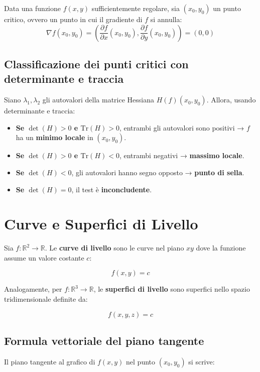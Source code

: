 \documentclass{article}
\begin{document}
Data una funzione \( f(x, y) \) sufficientemente regolare, sia \( (x_0, y_0) \) un punto critico, ovvero un punto in cui il gradiente di \( f \) si annulla:
\[
\nabla f(x_0, y_0) = \left( \frac{\partial f}{\partial x}(x_0, y_0), \frac{\partial f}{\partial y}(x_0, y_0) \right) = (0, 0)
\]

\subsection*{Classificazione dei punti critici con determinante e traccia}

Siano \( \lambda_1, \lambda_2 \) gli autovalori della matrice Hessiana \( H(f)(x_0, y_0) \). Allora, usando determinante e traccia:

\begin{itemize}
    \item \textbf{Se \( \det(H) > 0 \) e \( \text{Tr}(H) > 0 \)}, entrambi gli autovalori sono positivi → \( f \) ha un \textbf{minimo locale} in \( (x_0, y_0) \).
    
    \item \textbf{Se \( \det(H) > 0 \) e \( \text{Tr}(H) < 0 \)}, entrambi negativi → \textbf{massimo locale}.
    
    \item \textbf{Se \( \det(H) < 0 \)}, gli autovalori hanno segno opposto → \textbf{punto di sella}.
    
    \item \textbf{Se \( \det(H) = 0 \)}, il test è \textbf{inconcludente}.
\end{itemize}


\section{Curve e Superfici di Livello}
Sia \( f: \mathbb{R}^2 \to \mathbb{R} \). Le \textbf{curve di livello} sono le curve nel piano \( xy \) dove la funzione assume un valore costante \( c \):

\[
f(x, y) = c
\]

Analogamente, per \( f: \mathbb{R}^3 \to \mathbb{R} \), le \textbf{superfici di livello} sono superfici nello spazio tridimensionale definite da:

\[
f(x, y, z) = c
\]
\subsection*{Formula vettoriale del piano tangente}
Il piano tangente al grafico di \( f(x,y) \) nel punto \( (x_0, y_0) \) si scrive:
\end{document}
